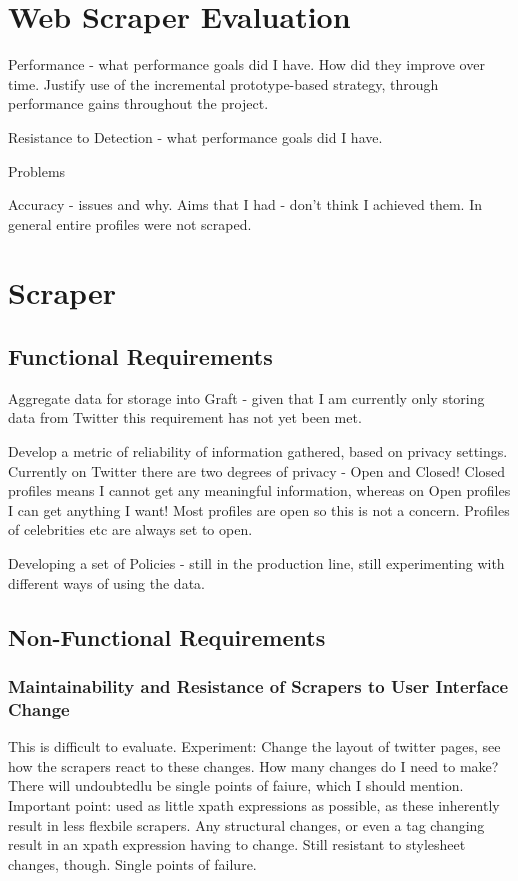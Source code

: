 
\section{Web Scraper Evaluation}

Performance - what performance goals did I have. How did they improve over time. Justify use of the incremental prototype-based strategy, through performance gains throughout the project.

Resistance to Detection - what performance goals did I have.

Problems

Accuracy - issues and why. Aims that I had - don't think I achieved them. In general entire profiles were not scraped. 

\section{Scraper}

\subsection{Functional Requirements}

Aggregate data for storage into Graft - given that I am currently only storing data from Twitter this requirement has not yet been met.

Develop a metric of reliability of information gathered, based on privacy settings. Currently on Twitter there are two degrees of privacy - Open and Closed! Closed profiles means I cannot get any meaningful information, whereas on Open profiles I can get anything I want! Most profiles are open so this is not a concern. Profiles of celebrities etc are always set to open.

Developing a set of Policies - still in the production line, still experimenting with different ways of using the data.

\subsection{Non-Functional Requirements}

\subsubsection{Maintainability and Resistance of Scrapers to User Interface Change}
This is difficult to evaluate. Experiment: Change the layout of twitter pages, see how the scrapers react to these changes. How many changes do I need to make? There will undoubtedlu be single points of faiure, which I should mention. Important point: used as little xpath expressions as possible, as these inherently result in less flexbile scrapers. Any structural changes, or even a tag changing result in an xpath expression having to change. Still resistant to stylesheet changes, though.
Single points of failure.

